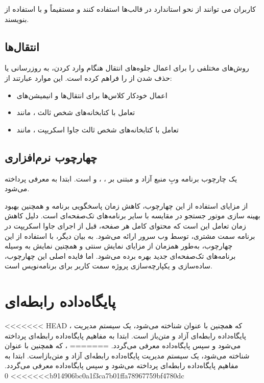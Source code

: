 {{کاربران  می توانند از نحو استاندارد در قالب‌ها استفاده کنند و مستقیماً و با استفاده از  بنویسند.


\subsection{انتقال‌ها}
{} روش‌های مختلفی را برای اعمال جلوه‌های انتقال هنگام وارد کردن، به روزرسانی یا حذف شدن از  را فراهم کرده است. این موارد عبارتند از:

\begin{itemize}
   	\item اعمال خودکار کلاس‌ها برای انتقال‌ها و انیمیشن‌های 
   	\item تعامل با کتابخانه‌های شخص ثالث ، مانند 
   	\item تعامل با کتابخانه‌های شخص ثالث جاوا اسکریپت ، مانند 
\end{itemize}




\subsection{چهارچوب نرم‌افزاری }
\cite{Nuxt} یک چارچوب برنامه وبِ منبع آزاد و مبتنی بر  ،  ،  و  است.
  ابتدا به معرفی  پرداخته می‌شود.

از مزایای استفاده از این چهارچوب، کاهش زمان پاسخگویی برنامه و همچنین بهبود بهینه سازی موتور جستجو در مقایسه با سایر برنامه‌های تک‌صفحه‌ای است. دلیل کاهش زمان تعامل این است که محتوای کامل هر صفحه، قبل از اجرای جاوا اسکریپت در برنامه سمت مشتری، توسط وب سرور ارائه می‌شود. به بیان دیگر، با استفاده از این چهارچوب، به‌طور همزمان از مزایای نمایش سنتی  و همچنین نمایش به وسیله برنامه‌های تک‌صفحه‌ای جدید بهره برده می‌شود.
اما فایده اصلی این چهارچوب، ساده‌سازی و یکپارچه‌سازی پروژه سمت کاربر برای برنامه‌نویس است.


\section{پایگاه‌داده رابطه‌ای }
<<<<<<< HEAD
\cite{Postgress}، که همچنین با عنوان  شناخته می‌شود، یک سیستم مدیریت پایگاه‌داده رابطه‌ای آزاد و متن‌باز است. ابتدا به مفاهیم پایگاه‌داده رابطه‌ای پرداخته می‌شود و سپس پایگاه‌داده  معرفی می‌گردد.
=======
\cite{Postgress}، که همچنین با عنوان  شناخته می‌شود، یک سیستم مدیریت پایگاه‌داده رابطه‌ای آزاد و متن‌بازاست. ابتدا به مفاهیم پایگاه‌داده رابطه‌ای پرداخته می‌شود و سپس پایگاه‌داده  معرفی می‌گردد.
>>>>>>> 0b914906bc0a1f3ca7b01ffa78967759bf4780dc
 
}}
